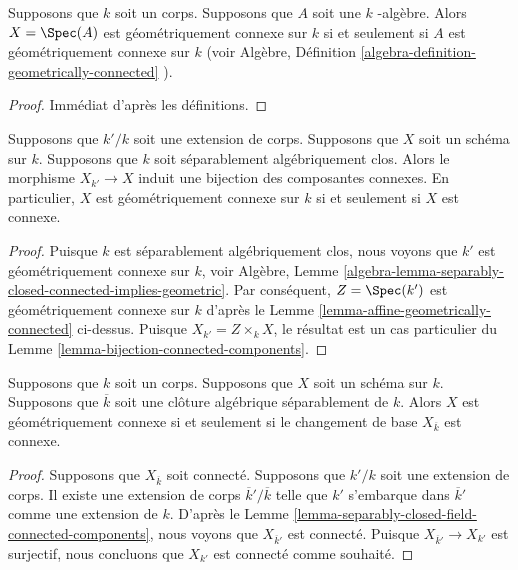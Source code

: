 \begin{lemma}
\label{lemma-affine-geometrically-connected}
Supposons que $k$ soit un corps. Supposons que $A$
soit une $k$ -algèbre. Alors $X = \Spec(A)$ est
géométriquement connexe sur $k$ si et seulement si $A$
est géométriquement connexe sur $k$ (voir Algèbre,
Définition \ref{algebra-definition-geometrically-connected} ).
\end{lemma}

\begin{proof}
Immédiat d'après les définitions.
\end{proof}

\begin{lemma}
\label{lemma-separably-closed-field-connected-components}
Supposons que $k'/k$ soit une extension de corps.
Supposons que $X$ soit un schéma sur $k$. Supposons
que $k$ soit séparablement algébriquement clos. Alors
le morphisme $X_{k'} \to X$ induit une bijection des
composantes connexes. En particulier, $X$ est
géométriquement connexe sur $k$ si et seulement si $X$ est connexe.
\end{lemma}

\begin{proof}
Puisque $k$ est séparablement algébriquement clos, nous
voyons que $k'$ est géométriquement connexe sur $k$, voir
Algèbre, Lemme
\ref{algebra-lemma-separably-closed-connected-implies-geometric}.
Par conséquent, $Z = \Spec(k')$ est géométriquement connexe sur
$k$ d'après le Lemme \ref{lemma-affine-geometrically-connected}
ci-dessus. Puisque $X_{k'} = Z \times_k X$, le résultat est un cas
particulier du Lemme \ref{lemma-bijection-connected-components}.
\end{proof}

\begin{lemma}
\label{lemma-characterize-geometrically-connected}
Supposons que $k$ soit un corps. Supposons que $X$
soit un schéma sur $k$. Supposons que $\overline{k}$
soit une clôture algébrique séparablement de $k$.
Alors $X$ est géométriquement connexe si et seulement
si le changement de base $X_{\overline{k}}$ est connexe.
\end{lemma}

\begin{proof}
Supposons que $X_{\overline{k}}$ soit connecté. Supposons
que $k'/k$ soit une extension de corps. Il existe une
extension de corps $\overline{k}'/\overline{k}$ telle que
$k'$ s'embarque dans $\overline{k}'$ comme une extension de
$k$. D'après le Lemme
\ref{lemma-separably-closed-field-connected-components}, nous voyons que
$X_{\overline{k}'}$ est connecté. Puisque $X_{\overline{k}'} \to X_{k'}$
est surjectif, nous concluons que $X_{k'}$ est connecté comme souhaité.
\end{proof}

